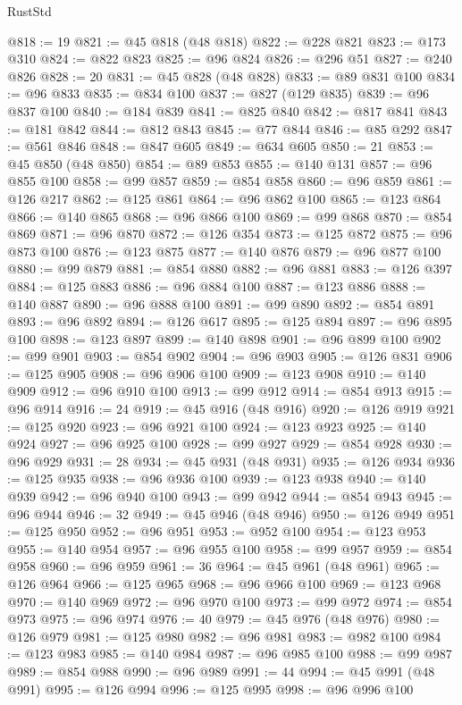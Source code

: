 \begin{lexlean}{RustStd}
\begin{coremodule}
@818 := 19
@821 := @45 @818 (@48 @818)
@822 := @228 @821
@823 := @173 @310
@824 := @822 @823
@825 := @96 @824
@826 := @296 @51
@827 := @240 @826
@828 := 20
@831 := @45 @828 (@48 @828)
@833 := @89 @831 @100
@834 := @96 @833
@835 := @834 @100
@837 := @827 (@129 @835)
@839 := @96 @837 @100
@840 := @184 @839
@841 := @825 @840
@842 := @817 @841
@843 := @181 @842
@844 := @812 @843
@845 := @77 @844
@846 := @85 @292
@847 := @561 @846
@848 := @847 @605
@849 := @634 @605
@850 := 21
@853 := @45 @850 (@48 @850)
@854 := @89 @853
@855 := @140 @131
@857 := @96 @855 @100
@858 := @99 @857
@859 := @854 @858
@860 := @96 @859
@861 := @126 @217
@862 := @125 @861
@864 := @96 @862 @100
@865 := @123 @864
@866 := @140 @865
@868 := @96 @866 @100
@869 := @99 @868
@870 := @854 @869
@871 := @96 @870
@872 := @126 @354
@873 := @125 @872
@875 := @96 @873 @100
@876 := @123 @875
@877 := @140 @876
@879 := @96 @877 @100
@880 := @99 @879
@881 := @854 @880
@882 := @96 @881
@883 := @126 @397
@884 := @125 @883
@886 := @96 @884 @100
@887 := @123 @886
@888 := @140 @887
@890 := @96 @888 @100
@891 := @99 @890
@892 := @854 @891
@893 := @96 @892
@894 := @126 @617
@895 := @125 @894
@897 := @96 @895 @100
@898 := @123 @897
@899 := @140 @898
@901 := @96 @899 @100
@902 := @99 @901
@903 := @854 @902
@904 := @96 @903
@905 := @126 @831
@906 := @125 @905
@908 := @96 @906 @100
@909 := @123 @908
@910 := @140 @909
@912 := @96 @910 @100
@913 := @99 @912
@914 := @854 @913
@915 := @96 @914
@916 := 24
@919 := @45 @916 (@48 @916)
@920 := @126 @919
@921 := @125 @920
@923 := @96 @921 @100
@924 := @123 @923
@925 := @140 @924
@927 := @96 @925 @100
@928 := @99 @927
@929 := @854 @928
@930 := @96 @929
@931 := 28
@934 := @45 @931 (@48 @931)
@935 := @126 @934
@936 := @125 @935
@938 := @96 @936 @100
@939 := @123 @938
@940 := @140 @939
@942 := @96 @940 @100
@943 := @99 @942
@944 := @854 @943
@945 := @96 @944
@946 := 32
@949 := @45 @946 (@48 @946)
@950 := @126 @949
@951 := @125 @950
@952 := @96 @951
@953 := @952 @100
@954 := @123 @953
@955 := @140 @954
@957 := @96 @955 @100
@958 := @99 @957
@959 := @854 @958
@960 := @96 @959
@961 := 36
@964 := @45 @961 (@48 @961)
@965 := @126 @964
@966 := @125 @965
@968 := @96 @966 @100
@969 := @123 @968
@970 := @140 @969
@972 := @96 @970 @100
@973 := @99 @972
@974 := @854 @973
@975 := @96 @974
@976 := 40
@979 := @45 @976 (@48 @976)
@980 := @126 @979
@981 := @125 @980
@982 := @96 @981
@983 := @982 @100
@984 := @123 @983
@985 := @140 @984
@987 := @96 @985 @100
@988 := @99 @987
@989 := @854 @988
@990 := @96 @989
@991 := 44
@994 := @45 @991 (@48 @991)
@995 := @126 @994
@996 := @125 @995
@998 := @96 @996 @100

\end{coremodule}
\end{lexlean}
